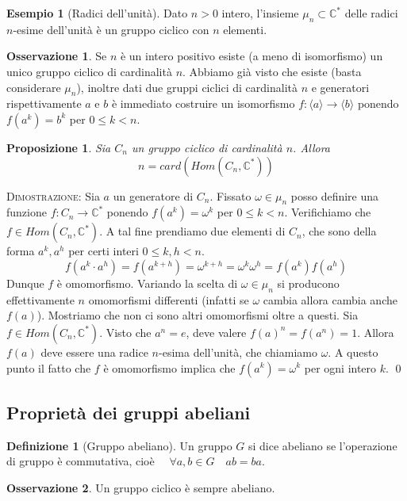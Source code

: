 \documentclass[11pt]{article}
\theoremstyle{plain}
\newtheorem{prop}[thm]{Proposizione}
\theoremstyle{definition}
\newtheorem{defn}{Definizione}[section]
\newtheorem{exmp}{Esempio}[section]
\newtheorem*{rem}{Osservazione}
\theoremstyle{remark}
\newcommand{\C}{\mathbb{C}}
\begin{document}
\begin{exmp}[Radici dell'unità]
Dato $n>0$ intero, l'insieme $\mu_n\subset \C^*$ delle radici $n$-esime dell'unità è un gruppo ciclico con $n$ elementi.
\end{exmp}

\begin{rem} Se $n$ è un intero positivo esiste (a meno di isomorfismo) un unico gruppo ciclico di cardinalità $n$.
Abbiamo già visto che esiste (basta considerare $\mu_n$),
inoltre dati due gruppi ciclici di cardinalità $n$ e generatori rispettivamente $a$ e $b$ è immediato costruire un
isomorfismo $f:\langle a\rangle\to\langle b\rangle$ ponendo $f(a^k) = b^k$ per $0\le k < n$.
\end{rem}


\begin{prop} Sia $C_n$ un gruppo ciclico di cardinalità $n$. Allora
\[ n = card(Hom(C_n,\C^*))\]
\end{prop}
\textsc{Dimostrazione:} Sia $a$ un generatore di $C_n$. Fissato $\omega\in\mu_n$ posso definire
una funzione $f:C_n\to\C^*$ ponendo $f(a^k) = \omega^k$ per $0\le k < n$.
Verifichiamo che $f\in Hom(C_n, \C^*)$. A tal fine prendiamo due elementi di $C_n$, che sono della forma $a^k, a^h$ per certi interi $0\le k,h < n$.
\[f(a^k \cdot a^h) = f(a^{k+h}) = \omega^{k+h} = \omega^k \omega^h = f(a^k)f(a^h)\]
Dunque $f$ è omomorfismo. Variando la scelta di $\omega\in\mu_n$ si producono effettivamente $n$ omomorfismi differenti (infatti se $\omega$ cambia allora cambia anche $f(a)$).
Mostriamo che non ci sono altri omomorfismi oltre a questi.
Sia $f\in Hom(C_n,\C^*)$. Visto che $a^n=e$, deve valere $f(a)^n = f(a^n) = 1$. Allora $f(a)$ deve essere una radice $n$-esima
dell'unità, che chiamiamo $\omega$. A questo punto il fatto che $f$ è omomorfismo implica che $f(a^k) = \omega^k$ per ogni intero $k$. \qed



\subsection{Proprietà dei gruppi abeliani}
\begin{defn}[Gruppo abeliano] Un gruppo $G$ si dice abeliano se l'operazione di gruppo è commutativa, cioè $\quad\forall a,b\in G\quad ab=ba$.
\end{defn}

\begin{rem} Un gruppo ciclico è sempre abeliano.
\end{rem}
\end{document}
